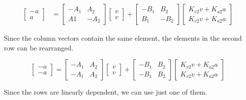 \begin{align*}
  \begin{bmatrix}
    -a \\
    a
  \end{bmatrix} &=
    \begin{bmatrix}
      -A_1 & A_2 \\
      A1 & -A_2
    \end{bmatrix}
    \begin{bmatrix}
      v \\
      v
    \end{bmatrix} +
    \begin{bmatrix}
      -B_1 & B_2 \\
      B_1 & -B_2
    \end{bmatrix}
    \begin{bmatrix}
      K_{v2} v + K_{a2} a \\
      K_{v2} v + K_{a2} a
    \end{bmatrix}
\end{align*}

Since the column vectors contain the same element, the elements in the second
row can be rearranged.

\begin{equation*}
  \begin{bmatrix}
    -a \\
    -a
  \end{bmatrix} =
  \begin{bmatrix}
    -A_1 & A_2 \\
    -A_1 & A_2
  \end{bmatrix}
  \begin{bmatrix}
    v \\
    v
  \end{bmatrix} +
  \begin{bmatrix}
    -B_1 & B_2 \\
    -B_1 & B_2
  \end{bmatrix}
  \begin{bmatrix}
    K_{v2} v + K_{a2} a \\
    K_{v2} v + K_{a2} a
  \end{bmatrix}
\end{equation*}

Since the rows are linearly dependent, we can use just one of them.

